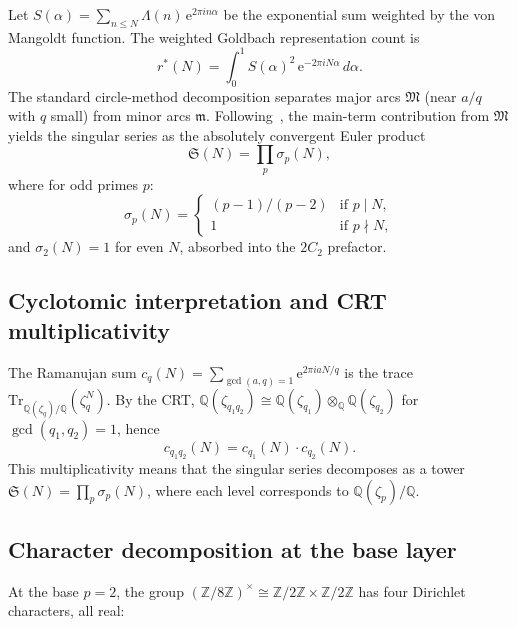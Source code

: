 \documentclass[11pt,a4paper]{article}
\theoremstyle{remark}
\newcommand{\Z}{\mathbb{Z}}
\newcommand{\Q}{\mathbb{Q}}
\newcommand{\mM}{\mathfrak{M}}
\newcommand{\mm}{\mathfrak{m}}
\newcommand{\e}{\mathrm{e}}
\begin{document}
Let $S(\alpha) = \sum_{n \leq N}\Lambda(n)\,\e^{2\pi i n\alpha}$ be the
exponential sum weighted by the von Mangoldt function.  The weighted
Goldbach representation count is
\begin{equation}
\label{eq:circle-integral}
  r^*(N) = \int_0^1 S(\alpha)^2\,\e^{-2\pi i N\alpha}\,d\alpha.
\end{equation}
The standard circle-method decomposition separates major arcs
$\mM$ (near $a/q$ with $q$ small) from minor arcs $\mm$.
Following~\cite{IwaniecKowalski2004}, the main-term contribution from
$\mM$ yields the singular series as the absolutely convergent Euler product
\begin{equation}
\label{eq:sing-series-full}
  \mathfrak{S}(N) = \prod_p \sigma_p(N),
\end{equation}
where for odd primes $p$:
\begin{equation}
\label{eq:local-factor-odd}
  \sigma_p(N) = \begin{cases}
    (p-1)/(p-2) & \text{if } p \mid N, \\
    1 & \text{if } p \nmid N,
  \end{cases}
\end{equation}
and $\sigma_2(N) = 1$ for even $N$, absorbed into the $2C_2$ prefactor.

\subsection{Cyclotomic interpretation and CRT multiplicativity}
\label{subsec:cyclotomic}

The Ramanujan sum $c_q(N) = \sum_{\gcd(a,q)=1} \e^{2\pi i aN/q}$ is the
trace $\mathrm{Tr}_{\Q(\zeta_q)/\Q}(\zeta_q^N)$.  By the CRT,
$\Q(\zeta_{q_1 q_2}) \cong \Q(\zeta_{q_1}) \otimes_\Q \Q(\zeta_{q_2})$
for $\gcd(q_1,q_2)=1$, hence
\begin{equation}
\label{eq:crt-trace}
  c_{q_1 q_2}(N) = c_{q_1}(N) \cdot c_{q_2}(N).
\end{equation}
This multiplicativity means that the singular series decomposes as a tower
$\mathfrak{S}(N) = \prod_p \sigma_p(N)$, where each level corresponds to
$\Q(\zeta_p)/\Q$.

\subsection{Character decomposition at the base layer}
\label{subsec:character-decomp}

At the base $p=2$, the group $(\Z/8\Z)^\times \cong \Z/2\Z \times \Z/2\Z$
has four Dirichlet characters, all real:
\end{document}
